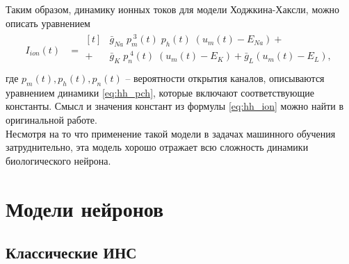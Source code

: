 \documentclass[a4paper,10pt]{article}
\begin{document}
	\indent Таким образом, динамику ионных токов для модели Ходжкина-Хаксли, можно описать уравнением
	\begin{align}\label{eq:hh_ion}
	I_{ion}(t) &= \begin{aligned}[t]
	&\bar{g}_{Na}\;p_{m}^{\;3}(t)\;p_{h}(t)\;(u_{m}(t)-E_{Na}) +	\\
	+\;&\bar{g}_{K}\;p_{n}^{\;4}(t)\;(u_{m}(t)-E_{K})+\bar{g}_{L}(u_{m}(t)-E_{L}),	\\
	\end{aligned}	
	\end{align}
	где $p_{m}(t), p_{h}(t), p_{n}(t)$ -- вероятности открытия каналов, описываются уравнением динамики \eqref{eq:hh_pch}, которые включают соответствующие константы. Смысл и значения констант из формулы \eqref{eq:hh_ion} можно найти в оригинальной работе\cite{HH}.\\
	\indent Несмотря на то что применение такой модели в задачах машинного обучения затруднительно, эта модель хорошо отражает всю сложность динамики биологического нейрона.

\section{Модели нейронов}
\subsection{Классические ИНС}
\end{document}
